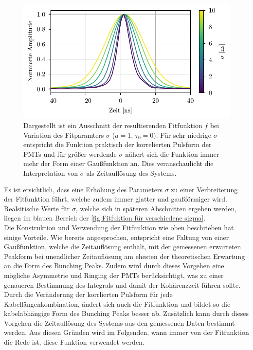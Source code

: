\begin{figure}[h]
    \centering
    \includegraphics{images/Analysis/corr_pulses_diff_sigma.pdf}
    \caption{Dargestellt ist ein Ausschnitt der resultierenden Fitfunktion $f$ bei Variation des Fitparamters $\sigma$ ($a=1$, $\tau_0=0$). Für sehr niedrige $\sigma$ entspricht die Funktion praktisch der korrelierten Pulsform der PMTs und für größer werdende $\sigma$ nähert sich die Funktion immer mehr der Form einer Gaußfunktion an. Dies veranschaulicht die Interpretation von $\sigma$ als Zeitauflösung des Systems.}
    \label{fig:Fitfuktion für verschiedene sigma}
\end{figure}
Es ist ersichtlich, dass eine Erhöhung des Parameters $\sigma$ zu einer Verbreiterung der Fitfunktion führt, welche zudem immer glatter und gaußförmiger wird. 
Realsitische Werte für $\sigma$, welche sich in späteren Abschnitten ergeben werden, liegen im blauen Bereich der \autoref{fig:Fitfuktion für verschiedene sigma}. \\

Die Konstruktion und Verwendung der Fitfunktion wie oben beschrieben hat einige Vorteile. 
Wie bereits angesprochen, entspricht eine Faltung von einer Gaußfunktion, welche die Zeitauflösung enthält, mit der gemessenen erwarteten Peakform bei unendlicher Zeitauflösung am ehesten der theoretischen Erwartung an die Form des Bunching Peaks. 
Zudem wird durch dieses Vorgehen eine mögliche Asymmetrie und Ringing der PMTs berücksichtigt, was zu einer genaueren Bestimmung des Integrals und damit der Kohärenzzeit führen sollte. 
Durch die Veränderung der korrlierten Pulsform für jede Kabellängenkombination, ändert sich auch die Fitfunktion und bildet so die kabelabhängige Form des Bunching Peaks besser ab. 
Zusätzlich kann durch dieses Vorgehen die Zeitauflösung des Systems aus den gemessenen Daten bestimmt werden. 
Aus diesen Gründen wird im Folgenden, wann immer von der Fitfunktion die Rede ist, diese Funktion verwendet werden. 
